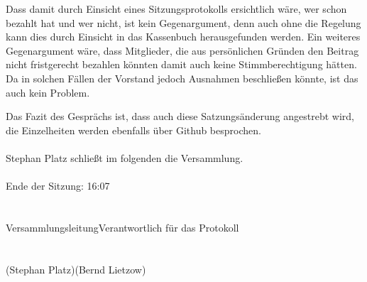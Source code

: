 \documentclass{scrartcl}
\begin{document}
Dass damit durch Einsicht eines Sitzungsprotokolls ersichtlich wäre, wer schon bezahlt hat und wer nicht, ist kein Gegenargument, denn auch ohne die Regelung kann dies durch Einsicht in das Kassenbuch herausgefunden werden.
Ein weiteres Gegenargument wäre, dass Mitglieder, die aus persönlichen Gründen den Beitrag nicht fristgerecht bezahlen könnten damit auch keine Stimmberechtigung hätten.
Da in solchen Fällen der Vorstand jedoch Ausnahmen beschließen könnte, ist das auch kein Problem.

Das Fazit des Gesprächs ist, dass auch diese Satzungsänderung angestrebt wird, die Einzelheiten werden ebenfalls über Github besprochen.
\\
\\
    Stephan Platz schließt im folgenden die Versammlung.\\
\\
    Ende der Sitzung: 16:07
\section*{}

Versammlungsleitung\hspace{5cm}Verantwortlich für das Protokoll\\
\\
\\
(Stephan Platz)\hspace{5.9cm}(Bernd Lietzow)
\\
\\
\end{document}
